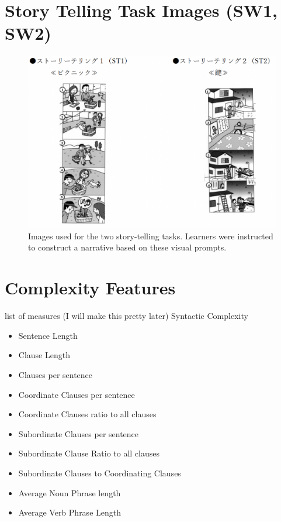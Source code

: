 \section{Story Telling Task Images (SW1, SW2)}
\begin{figure}[h!]
    \centering
    \includegraphics[scale=.45]{img/ST.png}
    \caption[Story Telling Tasks]{Images used for the two story-telling tasks. Learners were instructed to construct a narrative based on these visual prompts. }
    \label{fig:ST}
\end{figure}


\section{Complexity Features}
list of measures (I will make this pretty later)
Syntactic Complexity
\label{tab:complexity-measures}
\begin{itemize}
    \item Sentence Length
    \item Clause Length
    \item Clauses per sentence
    \item Coordinate Clauses per sentence
    \item Coordinate Clauses ratio to all clauses
    \item Subordinate Clauses per sentence
    \item Subordinate Clause Ratio to all clauses
    \item Subordinate Clauses to Coordinating Clauses
    \item Average Noun Phrase length
    \item Average Verb Phrase Length
\end{itemize}

